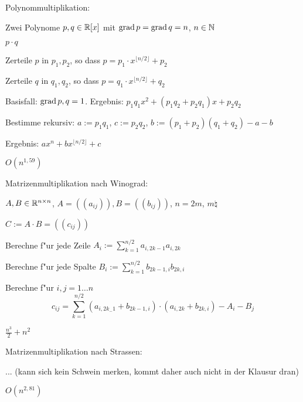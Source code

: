 \algorithm Polynommultiplikation:{
  \given Zwei Polynome $p,q\in\mathbb R[x]$ mit $\operatorname{grad} p=\operatorname{grad} q=n$, $n\in\mathbb N$
  
  \aim $p\cdot q$
  
  \begin{proc}
     \item Zerteile $p$ in $p_1,p_2$, so dass 
       $p=p_1\cdot x^{\lfloor n/2 \rfloor}+p_2$
     \item Zerteile $q$ in $q_1,q_2$, so dass 
       $p=q_1\cdot x^{\lfloor n/2 \rfloor}+q_2$
     \item Basisfall: $\operatorname{grad} p,q=1$. 
       Ergebnis: $p_1q_1x^2+(p_1q_2+p_2q_1)x+p_2q_2$
     \item Bestimme rekursiv: $a:=p_1q_1$, $c:=p_2q_2$,
       $b:=(p_1+p_2)(q_1+q_2)-a-b$
     \item Ergebnis: $ax^n+bx^{\lfloor n/2 \rfloor}+c$
  \end{proc}
  
  \cpx $O(n^{1,59})$
}
\algorithm Matrizenmultiplikation nach Winograd:{
  \given $A,B\in\mathbb R^{n\times n}$, $A=((a_{ij})),B=((b_{ij}))$,
    $n=2m$, $m\natural$
  
  \aim $C:=A\cdot B=((c_{ij}))$
  
  \begin{proc}
    \item Berechne f"ur jede Zeile $A_i:=\sum_{k=1}^{n/2} a_{i,2k-1}a_{i,2k}$
    \item Berechne f"ur jede Spalte $B_i:=\sum_{k=1}^{n/2} b_{2k-1,i}b_{2k,i}$
    \item Berechne f"ur $i,j=1\ldots n$ 
      \[
        c_{ij}=\sum_{k=1}^{n/2} (a_{i,2k_-1}+b_{2k-1,i})\cdot (a_{i,2k}+b_{2k,i})-A_i-B_j
      \]
  \end{proc}
  
  \cpx $\frac{n^3}2+n^2$
}
\algorithm Matrizenmultiplikation nach Strassen:{
  ... (kann sich kein Schwein merken, kommt daher auch nicht in der Klausur dran)
    
  \cpx $O(n^{2,81})$
}
